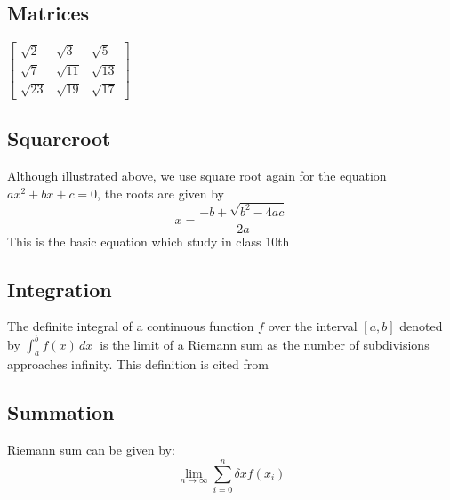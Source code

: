 \documentclass{article}
\begin{document}
\subsection{Matrices}
$\begin{bmatrix}
\sqrt{2} & \sqrt{3} & \sqrt{5}\\
\sqrt{7} & \sqrt{11} & \sqrt{13}\\
\sqrt{23} & \sqrt{19} & \sqrt{17}
\end{bmatrix}$

\subsection{Squareroot}
Although illustrated above, we use square root again for the equation $ ax^2 + bx + c = 0$, the roots are given by
$$ x = \frac{-b + \sqrt{b^2 - 4ac}}{2a} $$ %
This is the basic equation which study in class 10th \cite{education2016mathematics}
\newpage

\subsection{Integration}
The definite integral of a continuous function $f$ over the interval $[a, b]$ denoted by $\int_{a}^{b} f(x) \,dx\ $ is the limit of a Riemann sum as the number of subdivisions approaches infinity. This definition is cited from \cite{ghorpade2018course}

\subsection{Summation}
Riemann sum can be given by:
$$\lim_{n \rightarrow \infty} \sum_{i=0}^{n} \delta x f(x_i)$$
\end{document}
